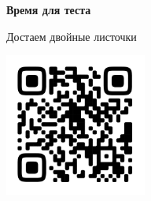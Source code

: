 \documentclass[aspectratio=169]{beamer}
\begin{document}
\begin{frame}
  \begin{center}
    {\huge \textbf{Время для теста}}

    \vspace*{1em}

    \sout{$\text{Достаем двойные листочки}$}

    \vspace*{1em}

    \includegraphics[width=0.35\textwidth]{images/form-qr.png}
  \end{center}
\end{frame}







\end{document}
